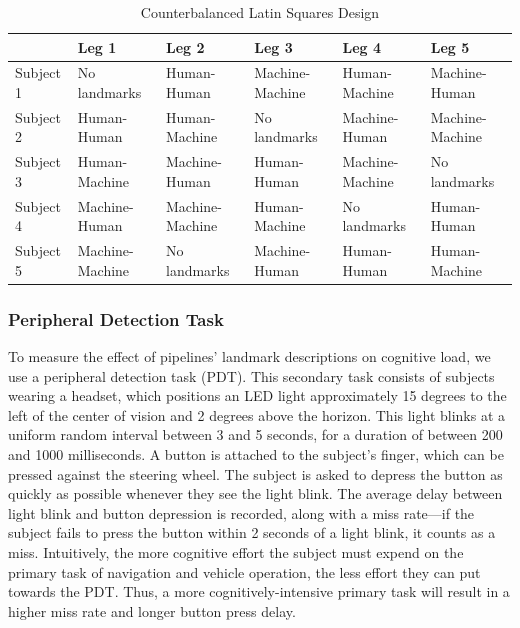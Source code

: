 \begin{table}[htbp]
  \centering
  \caption{Counterbalanced Latin Squares Design}
  \label{tab:latinsquares}
  {\tabulinesep=2mm
    \begin{singlespace}
    \begin{tabu} to \textwidth{|X[c]||X[c]|X[c]|X[c]|X[c]|X[c]|}
        \hline
        & Leg 1 & Leg 2 & Leg 3 & Leg 4 & Leg 5 \\
        \hline\hline
        Subject 1 & No landmarks    & Human-Human     & Machine-Machine & Human-Machine   & Machine-Human   \\
                \hline
        Subject 2 & Human-Human     & Human-Machine   & No landmarks    & Machine-Human   & Machine-Machine \\
                \hline
        Subject 3 & Human-Machine   & Machine-Human   & Human-Human     & Machine-Machine & No landmarks    \\
                \hline
        Subject 4 & Machine-Human   & Machine-Machine & Human-Machine   & No landmarks    & Human-Human     \\
                \hline
        Subject 5 & Machine-Machine & No landmarks    & Machine-Human   & Human-Human     & Human-Machine   \\
    \hline
    \end{tabu}
    \end{singlespace}
    }
\end{table}

\subsubsection{Peripheral Detection Task}

To measure the effect of pipelines' landmark descriptions on cognitive load, we use a peripheral detection task (PDT). This secondary task consists of subjects wearing a headset, which positions an LED light approximately 15 degrees to the left of the center of vision and 2 degrees above the horizon. This light blinks at a uniform random interval between 3 and 5 seconds, for a duration of between 200 and 1000 milliseconds. A button is attached to the subject's finger, which can be pressed against the steering wheel. The subject is asked to depress the button as quickly as possible whenever they see the light blink. The average delay between light blink and button depression is recorded, along with a miss rate---if the subject fails to press the button within 2 seconds of a light blink, it counts as a miss. Intuitively, the more cognitive effort the subject must expend on the primary task of navigation and vehicle operation, the less effort they can put towards the PDT. Thus, a more cognitively-intensive primary task will result in a higher miss rate and longer button press delay.

